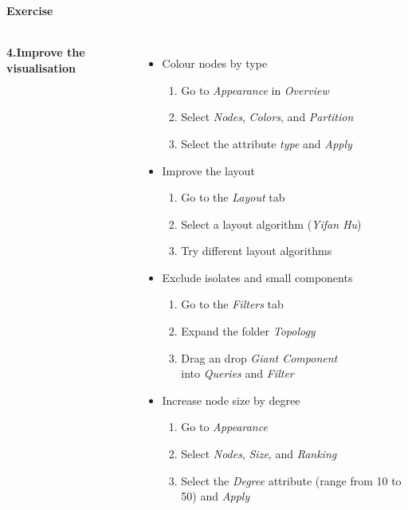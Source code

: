 \documentclass[8pt]{beamer}
\begin{document}
\begin{frame}
\frametitle{\insertsection}
\framesubtitle{Exercise}

\begin{columns}

\textbf{4.Improve the visualisation}
\begin{itemize}
	
\item Colour nodes by type
\begin{enumerate}
	\item Go to \textit{Appearance} in \textit{Overview}
	\item Select \textit{Nodes}, \textit{Colors}, and \textit{Partition}
	\item Select the attribute \textit{type} and \textit{Apply}
\end{enumerate}

\item Improve the layout
\begin{enumerate}
	\item Go to the \textit{Layout} tab
	\item Select a layout algorithm (\textit{Yifan Hu})
	\item Try different layout algorithms
\end{enumerate}

\item Exclude isolates and small components 
\begin{enumerate}
	\item Go to the \textit{Filters} tab
	\item Expand the folder \textit{Topology}
	\item Drag an drop \textit{Giant Component}\\
		  into \textit{Queries} and \textit{Filter}
\end{enumerate}

\item Increase node size by degree
\begin{enumerate}
	\item Go to \textit{Appearance}
	\item Select \textit{Nodes}, \textit{Size}, and \textit{Ranking}
	\item Select the \textit{Degree} attribute 
		 (range from 10 to 50) and \textit{Apply}
\end{enumerate}

\end{itemize}


\end{columns}
\end{frame}
\end{document}
